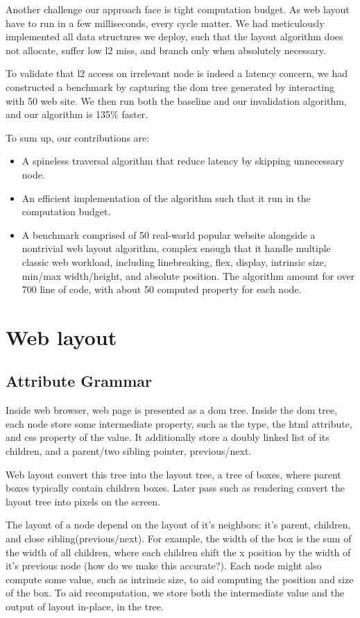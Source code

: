 \documentclass[format=acmsmall, review=false, screen=true]{acmart}
\begin{document}
Another challenge our approach face is tight computation budget. As web layout have to run in a few milliseconds, every cycle matter. We had meticulously implemented all data structures we deploy, such that the layout algorithm does not allocate, suffer low l2 miss, and branch only when absolutely necessary.

To validate that l2 access on irrelevant node is indeed a latency concern, we had constructed a benchmark by capturing the dom tree generated by interacting with 50 web site. We then run both the baseline and our invalidation algorithm, and our algorithm is 135\% faster.

To sum up, our contributions are:
\begin{itemize}
	\item A spineless traversal algorithm that reduce latency by skipping unnecessary node.
	\item An efficient implementation of the algorithm such that it run in the computation budget.
	\item A benchmark comprised of 50 real-world popular website alongside a nontrivial web layout algorithm, complex enough that it handle multiple classic web workload, including linebreaking, flex, display, intrinsic size, min/max width/height, and absolute position. The algorithm amount for over 700 line of code, with about 50 computed property for each node.
\end{itemize}

\section{Web layout}
\subsection{Attribute Grammar}
Inside web browser, web page is presented as a dom tree. Inside the dom tree, each node store some intermediate property, such as the type, the html attribute, and css property of the value. It additionally store a doubly linked list of its children, and a parent/two sibling pointer, previous/next. 

Web layout convert this tree into the layout tree, a tree of boxes, where parent boxes typically contain children boxes. Later pass such as rendering convert the layout tree into pixels on the screen.

The layout of a node depend on the layout of it's neighbors: it's parent, children, and close sibling(previous/next). For example, the width of the box is the sum of the width of all children, where each children shift the x position by the width of it's previous node (how do we make this accurate?). Each node might also compute some value, such as intrinsic size, to aid computing the position and size of the box. To aid recomputation, we store both the intermediate value and the output of layout in-place, in the tree.
\end{document}
